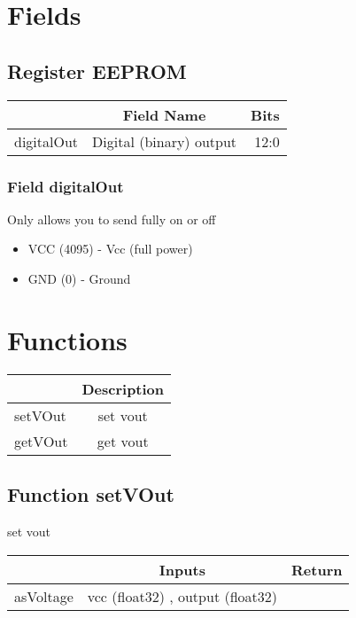 \documentclass[a4paper,12pt,oneside,pdflatex,italian,final,twocolumn]{article}
\begin{document}
\section{Fields}

 


\raggedright

\subsection{Register EEPROM}
\centering
\begin{tabular}{lcr}
\toprule
  & Field Name & Bits \\
\midrule
digitalOut & Digital (binary) output & 
12:0
\\
\bottomrule

\end{tabular}


\raggedright

\subsubsection{Field digitalOut }

Only allows you to send fully on or off


\begin{itemize}
\item VCC (4095) - Vcc (full power)
\item GND (0) - Ground
\end{itemize}




\raggedright

\section{Functions}

\centering
\begin{tabular}{lc}
\toprule
  & Description \\
\midrule
setVOut & set vout \\
getVOut & get vout \\
\bottomrule
\end{tabular}


\raggedright
\subsection{Function setVOut }
set vout \\

\centering
\begin{tabular}{lcr}
\toprule
  & Inputs & Return \\
\midrule
asVoltage &
vcc (float32)
, 
output (float32)

&
\\
\bottomrule
\end{tabular}
\end{document}
